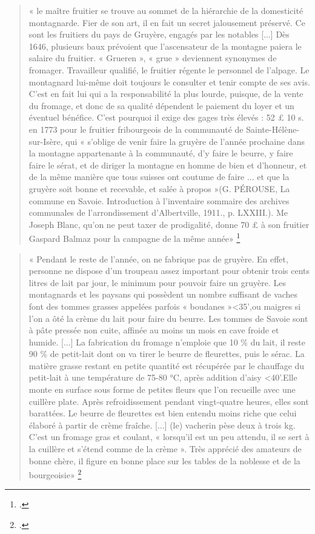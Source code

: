 \documentclass[12pt,a4paper]{report}
\begin{document}
	\begin{quote}
		« le maître fruitier se trouve au sommet de la hiérarchie de la domesticité montagnarde. Fier de son art, il en fait un secret
		jalousement préservé. Ce sont les fruitiers du pays de Gruyère, engagés par les	notables [...] Dès 1646, plusieurs baux prévoient que l'ascensateur de la montagne paiera le salaire du fruitier. « Grueren », « grue » deviennent synonymes de fromager. Travailleur qualifié, le fruitier régente le personnel de l'alpage. Le montagnard lui-même doit toujours le consulter et tenir compte de ses avis. C'est en fait lui qui a la responsabilité la plus lourde, puisque, de la vente du fromage, et donc de sa qualité dépendent le paiement du loyer et un éventuel bénéfice. C'est pourquoi il exige des gages très élevés : 52 £ 10 s. en 1773 pour le fruitier fribourgeois de la communauté de Sainte-Hélène-sur-Isère, qui « s'oblige de venir faire la gruyère de l'année prochaine dans la montagne appartenante à la communauté, d'y faire le beurre, y faire faire le sérat, et de diriger la montagne en homme de bien et d'honneur, et de la même manière que tous suisses ont coutume de faire ... et que la gruyère soit bonne et recevable, et salée à propos »(G. PÉROUSE, La commune en Savoie. Introduction à l'inventaire sommaire des archives communales de l'arrondissement d'Albertville, 1911., p. LXXIII.). Me Joseph Blanc, qu'on ne peut taxer de prodigalité, donne 70 £ à son fruitier Gaspard Balmaz pour la campagne de la même année»
		\footcite[148]{HViallet1993}
	\end{quote}
	
	\begin{quote}
		« Pendant le reste de l'année, on ne fabrique pas de gruyère. En effet, personne ne dispose d'un troupeau assez important pour obtenir trois cents litres de lait par jour, le minimum pour pouvoir faire un gruyère. Les montagnards et les paysans qui possèdent un nombre suffisant de vaches font des tommes grasses appelées parfois « boudanes »<35',ou maigres si l'on a ôté la crème du lait pour faire du beurre. Les tommes de Savoie sont à pâte pressée non cuite, affinée au moins un mois en cave froide et humide. [...] La fabrication du fromage n'emploie que 10 \% du lait, il reste 90 \% de petit-lait dont on va tirer le beurre de fleurettes, puis le sérac. La matière grasse restant en petite quantité est récupérée par le chauffage du petit-lait à une température de 75-80 °C, après addition d'aisy <40'.Elle monte en surface sous forme de petites fleurs que l'on recueille avec une cuillère plate. Après refroidissement pendant vingt-quatre heures, elles sont barattées. Le beurre de fleurettes est bien entendu moins riche que celui élaboré à partir de crème
		fraîche. [...] (le) vacherin pèse deux à trois kg. C'est
		un fromage gras et coulant, « lorsqu'il est un peu attendu, il se sert à la cuillère 	et s'étend comme de la crème ». Très apprécié des amateurs de bonne chère, il figure en bonne place sur les tables de la noblesse et de la bourgeoisie»
		\footcite[187-191]{HViallet1993}
	\end{quote}
	
\end{document}
